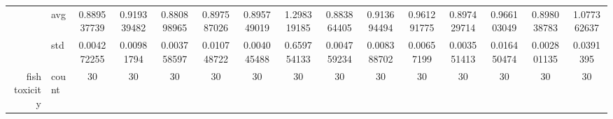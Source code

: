\begin{table}[htbp]
{\begin{tabular}{rlccc|c|c|c|c|c|ccccc}
			                                                                               & avg                & \cellcolor[rgb]{ .694,  .831,  .498}0.889537739                                & \cellcolor[rgb]{ 1,  .898,  .514}0.919339482                                   & \cellcolor[rgb]{ .388,  .745,  .482}\textcolor[rgb]{ 0,  .38,  0}{0.880898965} & \cellcolor[rgb]{ .98,  .914,  .514}0.897587026  & \cellcolor[rgb]{ .918,  .894,  .51}0.895749019                                 & \cellcolor[rgb]{ .973,  .412,  .42}1.298319185  & \cellcolor[rgb]{ .49,  .773,  .486}0.883864405                                 & \cellcolor[rgb]{ 1,  .902,  .518}0.913694494    & \cellcolor[rgb]{ .996,  .843,  .506}0.961291775 & \cellcolor[rgb]{ .976,  .914,  .514}0.897429714 & \cellcolor[rgb]{ .996,  .835,  .502}0.966103049 & \cellcolor[rgb]{ 1,  .922,  .518}0.898038783    & \cellcolor[rgb]{ .988,  .694,  .475}1.077362637 \\
			                                                                               & std                & 0.004272255                                                                    & 0.00981794                                                                     & 0.003758597                                                                    & 0.010748722                                     & 0.004045488                                                                    & 0.659754133                                     & 0.004759234                                                                    & 0.008388702                                     & 0.00657199                                      & 0.003551413                                     & 0.016450474                                     & 0.002801135                                     & 0.0391395                                       \\
			fish toxicity                                                                  & count              & 30                                                                             & 30                                                                             & 30                                                                             & 30                                              & 30                                                                             & 30                                              & 30                                                                             & 30                                              & 30                                              & 30                                              & 30                                              & 30                                              & 30                                              \\

\end{tabular}}
\end{table}
